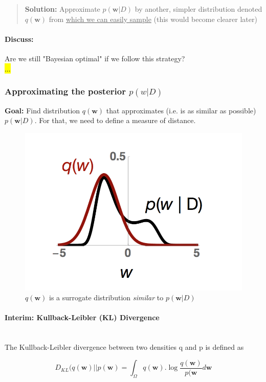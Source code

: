 \documentclass[main]{subfiles}
\begin{document}
\begin{quote}
    \textbf{Solution:} Approximate $p(\bm{w}|D)$ by another, simpler distribution denoted $q(\bm{w})$ from \underline{which we can easily sample} (this would become clearer later)
\end{quote}

\paragraph{Discuss:} Are we still "Bayesian optimal" if we follow this strategy?\\

\hl{...}


\subsubsection{Approximating the posterior $p(w|D)$}
\textbf{Goal:} Find distribution $q(\bm{w})$ that approximates (i.e. is as similar as possible) $p(\bm{w}|D)$. For that, we need to define a measure of distance.\\
\begin{figure}[H]
    	\centering
    	\includegraphics[width=0.6\linewidth]{05_LearningAsBayesianInference/figures/q_posterior.png}
    	\caption{$q(\bm{w})$ is a surrogate distribution \textit{similar} to $p(\bm{w}|D)$}
    	\label{fig:q_posterior}
    \end{figure}
\paragraph{Interim: Kullback-Leibler (KL) Divergence}\\

The Kullback-Leibler divergence between two densities q and p is
defined as

\begin{equation}
    D_{KL}(q(\bm{w})||p(\bm{w}) = \int_\Omega q(\bm{w}) . \log \frac{q(\bm{w})}{p(\bm{w}} d\bm{w}
    \label{eq:KL}
\end{equation}
\end{document}

